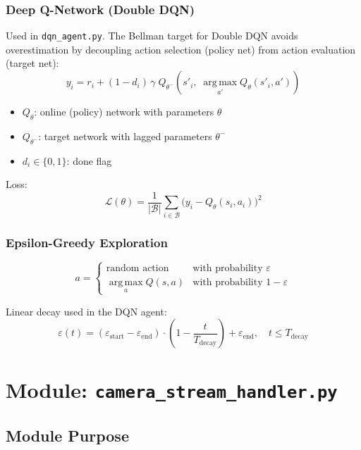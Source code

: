 \documentclass[12pt,a4paper,twoside]{report}
\theoremstyle{definition}
\newcommand{\argmax}{\operatorname*{arg\,max}}
\newcommand{\file}[1]{\texttt{\textcolor{codeblue}{#1}}}
\begin{document}
\subsection{Deep Q-Network (Double DQN)}

Used in \file{dqn\_agent.py}. The Bellman target for Double DQN avoids
overestimation by decoupling action selection (policy net) from action evaluation
(target net):
\[
  y_i = r_i + (1 - d_i)\,\gamma\; Q_{\theta^-}\!\left(s'_i,\; \argmax_{a'} Q_\theta(s'_i, a')\right)
\]
\begin{itemize}
  \item $Q_\theta$: online (policy) network with parameters $\theta$
  \item $Q_{\theta^-}$: target network with lagged parameters $\theta^-$
  \item $d_i \in \{0,1\}$: done flag
\end{itemize}

Loss:
\[
  \mathcal{L}(\theta) = \frac{1}{|\mathcal{B}|} \sum_{i \in \mathcal{B}} \bigl(y_i - Q_\theta(s_i, a_i)\bigr)^2
\]

\subsection{Epsilon-Greedy Exploration}

\[
  a = \begin{cases}
    \text{random action} & \text{with probability } \varepsilon \\
    \argmax_a Q(s,a) & \text{with probability } 1-\varepsilon
  \end{cases}
\]

Linear decay used in the DQN agent:
\[
  \varepsilon(t) = (\varepsilon_\text{start} - \varepsilon_\text{end})\cdot
                  \left(1 - \frac{t}{T_\text{decay}}\right) + \varepsilon_\text{end},
  \quad t \le T_\text{decay}
\]

\chapter{Module: \texttt{camera\_stream\_handler.py}}

\section{Module Purpose}
\end{document}
